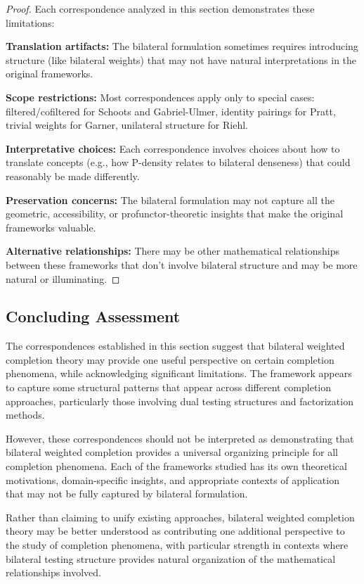 \documentclass[11pt]{article}
\theoremstyle{plain}
\theoremstyle{definition}
\theoremstyle{remark}
\begin{document}
\begin{proof}
Each correspondence analyzed in this section demonstrates these limitations:

\textbf{Translation artifacts:} The bilateral formulation sometimes requires introducing structure (like bilateral weights) that may not have natural interpretations in the original frameworks.

\textbf{Scope restrictions:} Most correspondences apply only to special cases: filtered/cofiltered for Schoots and Gabriel-Ulmer, identity pairings for Pratt, trivial weights for Garner, unilateral structure for Riehl.

\textbf{Interpretative choices:} Each correspondence involves choices about how to translate concepts (e.g., how P-density relates to bilateral denseness) that could reasonably be made differently.

\textbf{Preservation concerns:} The bilateral formulation may not capture all the geometric, accessibility, or profunctor-theoretic insights that make the original frameworks valuable.

\textbf{Alternative relationships:} There may be other mathematical relationships between these frameworks that don't involve bilateral structure and may be more natural or illuminating.
\end{proof}

\subsection{Concluding Assessment}

The correspondences established in this section suggest that bilateral weighted completion theory may provide one useful perspective on certain completion phenomena, while acknowledging significant limitations. The framework appears to capture some structural patterns that appear across different completion approaches, particularly those involving dual testing structures and factorization methods.

However, these correspondences should not be interpreted as demonstrating that bilateral weighted completion provides a universal organizing principle for all completion phenomena. Each of the frameworks studied has its own theoretical motivations, domain-specific insights, and appropriate contexts of application that may not be fully captured by bilateral formulation.

Rather than claiming to unify existing approaches, bilateral weighted completion theory may be better understood as contributing one additional perspective to the study of completion phenomena, with particular strength in contexts where bilateral testing structure provides natural organization of the mathematical relationships involved.
\end{document}
